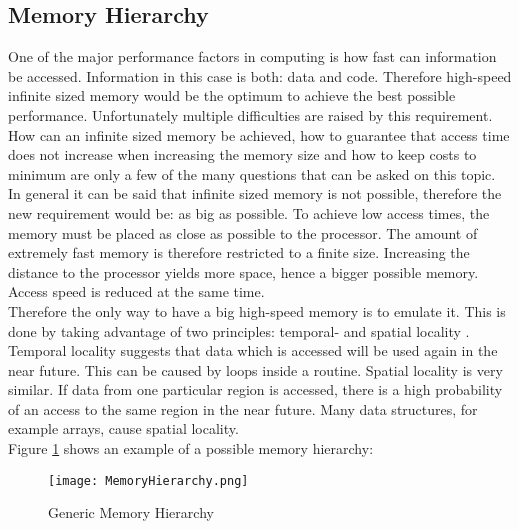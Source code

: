 \subsection{Memory Hierarchy}
One of the major performance factors in computing is how fast can information be accessed. Information in this case is both: data and code. Therefore high-speed infinite sized memory would be the optimum to achieve the best possible performance. Unfortunately multiple difficulties are raised by this requirement. How can an infinite sized memory be achieved, how to guarantee that access time does not increase when increasing the memory size and how to keep costs to minimum are only a few of the many questions that can be asked on this topic.\\
In general it can be said that infinite sized memory is not possible, therefore the new requirement would be: as big as possible. To achieve low access times, the memory must be placed as close as possible to the processor. The amount of extremely fast memory is therefore restricted to a finite size. Increasing the distance to the processor yields more space, hence a bigger possible memory. Access speed is reduced at the same time.\\
Therefore the only way to have a big high-speed memory is to emulate it. This is done by taking advantage of two principles: temporal- and spatial locality \cite{patterson:2017}.
Temporal locality suggests that data which is accessed will be used again in the near future. This can be caused by loops inside a routine. 
Spatial locality is very similar. If data from one particular region is accessed, there is a high probability of an access to the same region in the near future. Many data structures, for example arrays, cause spatial locality.\\
Figure \ref{fig:memHierarchy} shows an example of a possible memory hierarchy: 

\begin{figure}[h]
	\centering
	\texttt{[image: MemoryHierarchy.png]}
	\caption{Generic Memory Hierarchy \cite{picture:memoryhierarchy}}
	\label{fig:memHierarchy}
\end{figure}
 
